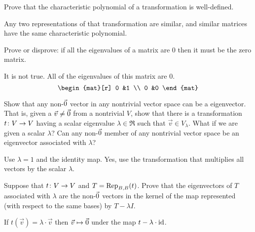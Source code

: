 \begin{exercises}
    Prove that 
    the characteristic polynomial of a transformation is well-defined.
    \begin{answer}
      Any two representations of that transformation are similar, and
      similar matrices have the same characteristic polynomial.  
    \end{answer}
  \item Prove or disprove: if all the eigenvalues of a matrix are $0$ 
    then it must be the zero matrix.
    \begin{answer}
      It is not true.
      All of the eigenvalues of this matrix are $0$.
      \begin{equation*}
        \begin{mat}[r]
          0  &1  \\
          0  &0
        \end{mat}
      \end{equation*}
    \end{answer}
  \recommended \item 
    \begin{exparts}
      \partsitem Show that any non-\( \zero \) vector in any nontrivial 
        vector space can be a eigenvector.
        That is, given a \( \vec{v}\neq\zero \) from a nontrivial \( V \),
        show that there is a transformation \( \map{t}{V}{V} \) having a scalar
        eigenvalue \( \lambda\in\Re \) such that \( \vec{v}\in V_{\lambda} \).
      \partsitem What if we are given a scalar \( \lambda \)?
        Can any non-\( \zero \) member of any
        nontrivial vector space be an eigenvector associated with \( \lambda \)?
    \end{exparts}
    \begin{answer}
      \begin{exparts}
        \partsitem Use \( \lambda=1 \) and the identity map.
        \partsitem Yes, use the transformation that multiplies all 
          vectors by the scalar \( \lambda \).
      \end{exparts}  
     \end{answer}
  \recommended \item 
    Suppose that \( \map{t}{V}{V} \) and \( T=\rep{t}{B,B} \).
    Prove that the eigenvectors of \( T \) associated with \( \lambda \) are
    the non-\( \zero \) vectors in the kernel of the map represented
    (with respect to the same bases) by \( T-\lambda I \).
    \begin{answer}
      If $t(\vec{v})=\lambda\cdot\vec{v}$ then 
      $\vec{v}\mapsto\zero$ under the map $t-\lambda\cdot\identity$.

\end{answer}
\end{exercises}
